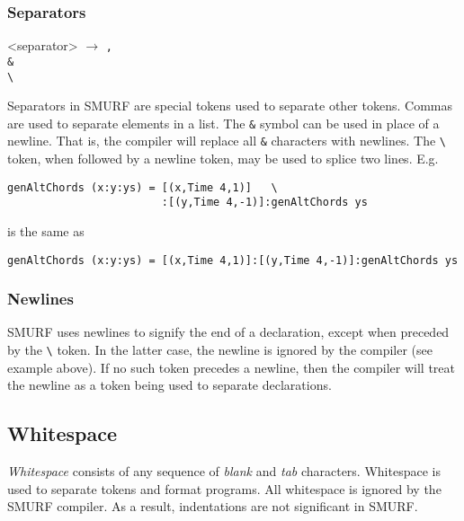 \subsubsection{Separators}

\begin{grammar}
<separator> $\rightarrow$ \texttt{,} \\
												  \texttt{\&} \\
													\texttt{\textbackslash}
\end{grammar}

Separators in SMURF are special tokens used to separate other tokens. 
Commas are used to separate elements in a list.
The \texttt{\&} symbol can be used in place of a newline. That is, the compiler
will replace all \texttt{\&} characters with newlines. The
\texttt{\textbackslash} token, when followed by a newline token,
may be used to splice two lines. E.g.
\begin{lstlisting}
genAltChords (x:y:ys) = [(x,Time 4,1)]   \
                        :[(y,Time 4,-1)]:genAltChords ys
\end{lstlisting}
is the same as 
\begin{lstlisting}
genAltChords (x:y:ys) = [(x,Time 4,1)]:[(y,Time 4,-1)]:genAltChords ys
\end{lstlisting}

\subsubsection{Newlines}
SMURF uses newlines to signify the end of a declaration, except
when preceded by the \texttt{\textbackslash} token. In the latter case, the newline is ignored by the compiler 
(see example above). If no such token precedes a newline, then the compiler will treat the newline as
a token being used to separate declarations.

\subsection{Whitespace}
\label{sec:whitespaces}
{\it Whitespace} consists of any sequence of {\it blank} and {\it tab} characters.
Whitespace is used to
separate tokens and format programs. All whitespace is ignored by the
SMURF compiler. As a result, indentations are not significant in SMURF.

